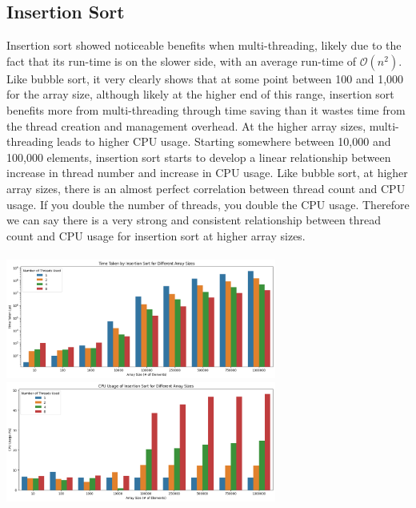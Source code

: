 \documentclass[conference]{IEEEtran}
\begin{document}
\subsection{Insertion Sort}
Insertion sort showed noticeable benefits when multi-threading, likely due to the fact that its run-time is on the slower side, with an average run-time of $\mathcal{O}(n^2)$. Like bubble sort, it very clearly shows that at some point between 100 and 1,000 for the array size, although likely at the higher end of this range, insertion sort benefits more from multi-threading through time saving than it wastes time from the thread creation and management overhead. At the higher array sizes, multi-threading leads to higher CPU usage. Starting somewhere between 10,000 and 100,000 elements, insertion sort starts to develop a linear relationship between increase in thread number and increase in CPU usage. Like bubble sort, at higher array sizes, there is an almost perfect correlation between thread count and CPU usage. If you double the number of threads, you double the CPU usage. Therefore we can say there is a very strong and consistent relationship between thread count and CPU usage for insertion sort at higher array sizes. 
\\\\
\includegraphics[width=3.5in]{InsertionSortTimeTaken.png}
\includegraphics[width=3.5in]{InsertionSortCPUUsage.png}
\end{document}
